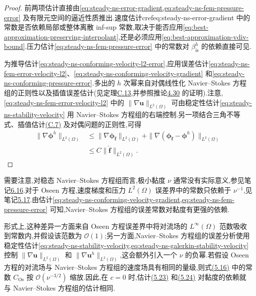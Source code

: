 \begin{proof}
前两项估计直接由\cref{eq:steady-ns-error-gradient,eq:steady-ns-fem-pressure-error} 及有限元空间的逼近性质推出.速度估计cref{eq:steady-ns-error-gradient} 中的常数是否依赖局部或整体离散 inf-sup 常数,取决于能否应用\cref{eq:best-approximation-preserving-interpolant},还是必须应用\cref{eq:best-approximation-vdiv-bound}.压力估计\cref{eq:steady-ns-fem-pressure-error} 中的常数对 $\beta_{\mathrm{is}}^h$ 的依赖直接可见.

为推导估计\cref{eq:steady-ns-conforming-velocity-l2-error},应用误差估计\cref{eq:steady-ns-fem-error-velocity-l2}、\cref{eq:steady-ns-conforming-velocity-gradient} 和\cref{eq:steady-ns-conforming-pressure-error}.多出的 $h$ 次幂来自对偶线性化 Navier--Stokes 方程组的正则性以及插值误差估计(见定理\hyperref[thm:appendix-c-13]{C.13},并参照推论\hyperref[cor:stokes-conforming-infsup-estimates]{4.30} 的证明).注意,\cref{eq:steady-ns-fem-error-velocity-l2} 中的 $\|\nabla\bm{u}\|_{L^2(\Omega)}$ 可由稳定性估计\cref{eq:steady-ns-stability-velocity} 用 Navier--Stokes 方程组的右端控制.另一项结合三角不等式、插值估计\hyperref[eq:appendix-c-7]{(C.7)} 及对偶问题的正则性,可得
\[
\begin{aligned}
  \|\nabla\symbf{\phi}^h\|_{L^2(\Omega)}
   &\le\|\nabla\symbf{\phi}_{\widehat{\bm{f}}}\|_{L^2(\Omega)}
      +\|\nabla(\symbf{\phi}_{\widehat{\bm{f}}}
                    -\symbf{\phi}^h)\|_{L^2(\Omega)}\\
   &\le C\|\widehat{\bm{f}}\|_{L^2(\Omega)}.
\end{aligned}
\]
\end{proof}

\begin{note}\label{note:steady-ns-fem-error-viscosity}
需要注意,对稳态 Navier--Stokes 方程组而言,极小黏度 $\nu$ 通常没有实际意义,参见笔记\hyperref[note:steady-ns-small-viscosity]{6.16}.对于 Oseen 方程,速度梯度和压力 $L^2(\Omega)$ 误差界中的常数只依赖于 $\nu^{-1}$,见笔记\hyperref[note:oseen-fem-error-coefficient-dependence]{5.17}.由估计\cref{eq:steady-ns-conforming-velocity-gradient,eq:steady-ns-fem-pressure-error} 可知,Navier--Stokes 方程组的误差常数对黏度有更强的依赖.

形式上,这种差异一方面来自 Oseen 方程误差界中将对流场的 $L^\infty(\Omega)$ 范数吸收到常数内,并假设该范数为 $\mathcal{O}(1)$;另一方面,Navier--Stokes 方程组的误差分析使用稳定性估计\cref{eq:steady-ns-stability-velocity,eq:steady-ns-galerkin-stability-velocity} 控制 $\|\nabla\bm{u}\|_{L^2(\Omega)}$ 和 $\|\nabla\bm{u}^h\|_{L^2(\Omega)}$,这会额外引入一个 $\nu$ 的负幂.若假设 Oseen 方程的对流场与 Navier--Stokes 方程组的速度场具有相同的量级,则式\hyperref[eq:oseen-fem-error-constant]{(5.16)} 中的常数 $C_{\mathrm{Os}}$ 按 $\mathcal{O}(\nu^{-3/2})$ 缩放.因此,在 $c=0$ 时,估计\hyperref[eq:oseen-fem-velocity-error]{(5.23)} 和\hyperref[eq:oseen-fem-pressure-error]{(5.24)} 对黏度的依赖就与 Navier--Stokes 方程组的估计相同.
\end{note}

